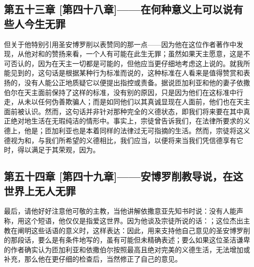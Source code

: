 
\subsection{第五十三章 [第四十八章]——在何种意义上可以说有些人今生无罪}

但关于他特别引用圣安博罗削以表赞同的那一点——因为他在这位作者著作中发现，从他对和的赞扬来看，一个人有可能在此生无罪；虽然如果天主愿意，这是不可否认的，因为在天主一切都是可能的，但他应当更仔细地考虑这上说的。就我所能见到的，这句话是根据某种行为标准而说的，这种标准在人看来是值得赞赏和表扬的，没有人能公正地质疑它以便提出指控或责备。据说匝加利亚和他的妻子依撒伯尔在天主面前保持了这样的标准，没有别的原因，只是因为他们在这标准中行走，从未以任何伪善欺骗人；而是如同他们以其真诚显现在人面前，他们也在天主面前被认识。然而，这句话并非针对那种完全的义德状态，即我们将来要在其中真正绝对地生活在无瑕纯洁的情形中。事实上，宗徒曾告诉我们，在法律所要求的义德上，他是；匝加利亚也是本着同样的法律过无可指摘的生活。然而，宗徒将这义德视为和，与我们所希望的义德相比，我们应当，以便将来当我们凭信德享有它时，得以满足于其荣观，因为。\par


\subsection{第五十四章 [第四十九章]——安博罗削教导说，在这世界上无人无罪}

最后，请他好好注意他可敬的主教，当他讲解依撒意亚先知书时说：没有人能声称，用这个短语，他仅仅是指爱这世界。因为他谈及宗徒所说的话：；这位杰出主教在阐明这些话语的意义时，这样表达：因此，用来支持他自己意见的圣安博罗削的那段话，要么是有条件地写的，虽有可能但未精确表述；要么如果这位圣洁谦卑的作者确实认为匝加利亚和依撒伯尔按照最高且绝对完美的义德生活，无法增加或补充，那么他在更仔细的检查后，当然修正了自己的意见。\par

